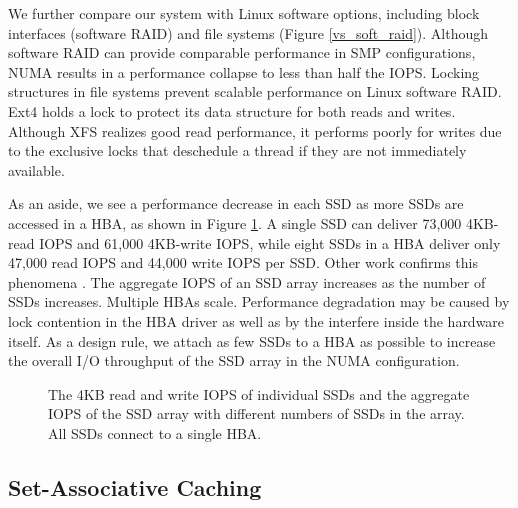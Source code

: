 We further compare our system with Linux software options, including 
block interfaces (software RAID) and file systems (Figure \ref{vs_soft_raid}).
Although software RAID can provide comparable performance in SMP configurations, 
NUMA results in a performance collapse to less than half the IOPS.   
Locking structures in file systems prevent scalable performance
on Linux software RAID.
Ext4 holds a lock to protect its data structure for both reads and writes.
Although XFS realizes good read performance, it performs poorly for writes
due to the exclusive locks that deschedule a thread if they are not
immediately available.

As an aside, we see a performance decrease in each SSD as more SSDs are
accessed in a HBA, as shown in Figure \ref{ssd_perf}. A single SSD can deliver
73,000 4KB-read IOPS and 61,000 4KB-write IOPS, while eight SSDs in a HBA
deliver only 47,000 read IOPS and 44,000 write IOPS per SSD.
Other work confirms this phenomena \cite{Foong10}. The aggregate IOPS
of an SSD array increases as the number of SSDs increases. Multiple HBAs scale.
Performance degradation may be caused by lock contention in the HBA driver
as well as by the interfere inside the hardware itself. As a design rule, 
we attach as few SSDs to a HBA as possible to increase the overall I/O throughput of
the SSD array in the NUMA configuration.

\begin{figure}[tb]
\begin{center}
\vspace{-15pt}

\vspace{-15pt}
\caption{The 4KB read and write IOPS of individual SSDs and the aggregate IOPS
	of the SSD array with different numbers of SSDs in the array. All SSDs
	connect to a single HBA.}
\label{ssd_perf}
\end{center}
\end{figure}

\subsection{Set-Associative Caching}

